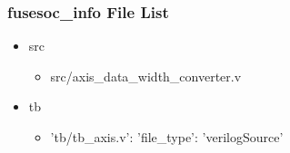 \subsubsection{fusesoc\_info File List}
\begin{itemize}
\item src
	\begin{itemize}
	\item src/axis\_data\_width\_converter.v
	\end{itemize}
\item tb
	\begin{itemize}
	\item {'tb/tb\_axis.v': {'file\_type': 'verilogSource'}}
	\end{itemize}
\end{itemize}
